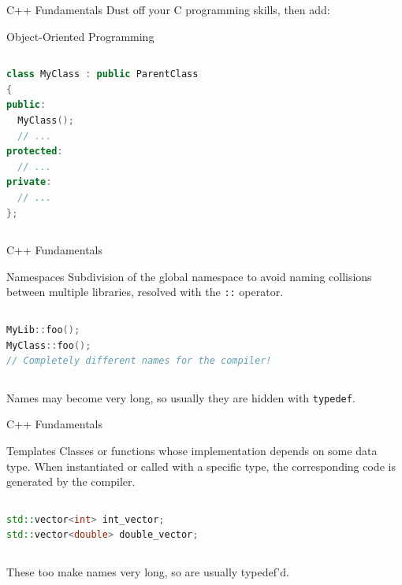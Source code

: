 \begin{frame}[fragile]{C++ Fundamentals}
Dust off your C programming skills, then add:
\begin{block}{Object-Oriented Programming}
\begin{columns}
\begin{lstlisting}[language=C++, caption=Example of definition of a C++ class]
class MyClass : public ParentClass
{
public:
  MyClass();
  // ...
protected:
  // ...
private:
  // ...
};
\end{lstlisting}
\end{columns}
\end{block}
\end{frame}
\begin{frame}[fragile]{C++ Fundamentals}
\begin{block}{Namespaces}
Subdivision of the global namespace to avoid naming collisions between multiple libraries, resolved with the \texttt{::} operator.

\begin{columns}
\begin{lstlisting}[language=C++, caption=Example of namespaces usage]
MyLib::foo();
MyClass::foo();
// Completely different names for the compiler!
\end{lstlisting}
\end{columns}

Names may become very long, so usually they are hidden with \texttt{typedef}.
\end{block}
\end{frame}
\begin{frame}[fragile]{C++ Fundamentals}
\begin{block}{Templates}
Classes or functions whose implementation depends on some data type. When instantiated or called with a specific type, the corresponding code is generated by the compiler.

\begin{columns}
\begin{lstlisting}[language=C++, caption=Example of objects of the template class \texttt{std::vector}]
std::vector<int> int_vector;
std::vector<double> double_vector;
\end{lstlisting}
\end{columns}

These too make names very long, so are usually typedef'd.
\end{block}
\end{frame}
